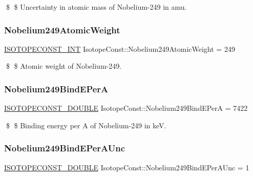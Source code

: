 \$ \$ Uncertainty in atomic mass of Nobelium-\/249 in amu. \mbox{\label{group___isotope_const-_nobelium-_no249_ga2463b937078e512756c5058b976fa5a8}} 
\subsubsection{\texorpdfstring{Nobelium249\+Atomic\+Weight}{Nobelium249AtomicWeight}}
{\footnotesize\ttfamily \mbox{\hyperlink{group___isotope_const-_macros_ga5f18360b3e99483a35c32d789e62621c}{I\+S\+O\+T\+O\+P\+E\+C\+O\+N\+S\+T\+\_\+\+I\+NT}} Isotope\+Const\+::\+Nobelium249\+Atomic\+Weight = 249}

\$ \$ Atomic weight of Nobelium-\/249. \mbox{\label{group___isotope_const-_nobelium-_no249_gacd4d3afe449e14591bd09fa6b8b547c8}} 
\subsubsection{\texorpdfstring{Nobelium249\+Bind\+E\+PerA}{Nobelium249BindEPerA}}
{\footnotesize\ttfamily \mbox{\hyperlink{group___isotope_const-_macros_ga8f45a7272ce02c0b4c65c44636ed719a}{I\+S\+O\+T\+O\+P\+E\+C\+O\+N\+S\+T\+\_\+\+D\+O\+U\+B\+LE}} Isotope\+Const\+::\+Nobelium249\+Bind\+E\+PerA = 7422}

\$ \$ Binding energy per A of Nobelium-\/249 in keV. \mbox{\label{group___isotope_const-_nobelium-_no249_ga1beb2a1e6a0926cad88430f60eabf2e6}} 
\subsubsection{\texorpdfstring{Nobelium249\+Bind\+E\+Per\+A\+Unc}{Nobelium249BindEPerAUnc}}
{\footnotesize\ttfamily \mbox{\hyperlink{group___isotope_const-_macros_ga8f45a7272ce02c0b4c65c44636ed719a}{I\+S\+O\+T\+O\+P\+E\+C\+O\+N\+S\+T\+\_\+\+D\+O\+U\+B\+LE}} Isotope\+Const\+::\+Nobelium249\+Bind\+E\+Per\+A\+Unc = 1}

